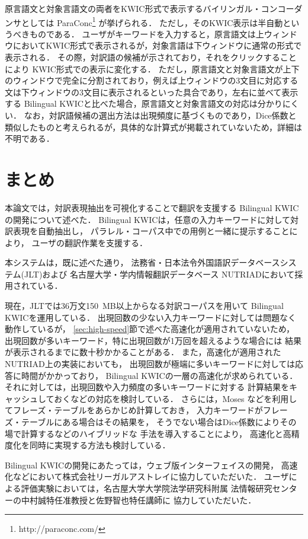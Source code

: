 \documentclass[japanese]{jnlp_1.4}
\begin{document}
原言語文と対象言語文の両者をKWIC形式で表示するバイリンガル・コンコーダンサとしては
ParaConc\footnote{http://paraconc.com/} \cite{Barlow}が挙げられる．
ただし，そのKWIC表示は半自動というべきものである．
ユーザがキーワードを入力すると，原言語文は上ウィンドウにおいてKWIC形式で表示されるが，対象言語は下ウィンドウに通常の形式で表示される．
その際，対訳語の候補が示されており，それをクリックすることにより KWIC形式での表示に変化する．
ただし，原言語文と対象言語文が上下のウィンドウで完全に分割されており，例えば上ウィンドウの3文目に対応する文は下ウィンドウの3文目に表示されるといった具合であり，左右に並べて表示する
Bilingual KWICと比べた場合，原言語文と対象言語文の対応は分かりにくい．
なお，対訳語候補の選出方法は出現頻度に基づくものであり，Dice係数と類似したものと考えられるが，具体的な計算式が掲載されていないため，詳細は不明である．


\section{まとめ}
\label{sec:conclusion}

本論文では，対訳表現抽出を可視化することで翻訳を支援する
Bilingual KWICの開発について述べた．
Bilingual KWICは，任意の入力キーワードに対して対訳表現を自動抽出し，
パラレル・コーパス中での用例と一緒に提示することにより，
ユーザの翻訳作業を支援する．

本システムは，既に述べた通り，
法務省・日本法令外国語訳データベースシステム(JLT)および
名古屋大学・学内情報翻訳データベース 
NUTRIADにおいて採用されている．

現在，JLTでは36万文150~MB以上からなる対訳コーパスを用いて
Bilingual KWICを運用している．
出現回数の少ない入力キーワードに対しては問題なく動作しているが，
\ref{sec:high-speed}節で述べた高速化が適用されていないため，
出現回数が多いキーワード，特に出現回数が1万回を超えるような場合には
結果が表示されるまでに数十秒かかることがある．
また，高速化が適用されたNUTRIAD上の実装においても，
出現回数が極端に多いキーワードに対しては応答に時間がかかっており，
Bilingual KWICの一層の高速化が求められている．
それに対しては，出現回数や入力頻度の多いキーワードに対する
計算結果をキャッシュしておくなどの対応を検討している．
さらには，Moses などを利用してフレーズ・テーブルをあらかじめ計算しておき，
入力キーワードがフレーズ・テーブルにある場合はその結果を，
そうでない場合はDice係数によりその場で計算するなどのハイブリッドな
手法を導入することにより，
高速化と高精度化を同時に実現する方法も検討している．

\acknowledgment

Bilingual KWICの開発にあたっては，ウェブ版インターフェイスの開発，
高速化などにおいて株式会社リーガルアストレイに協力していただいた．
ユーザによる評価実験においては，名古屋大学大学院法学研究科附属
法情報研究センターの中村誠特任准教授と佐野智也特任講師に
協力していただいた．
\end{document}

